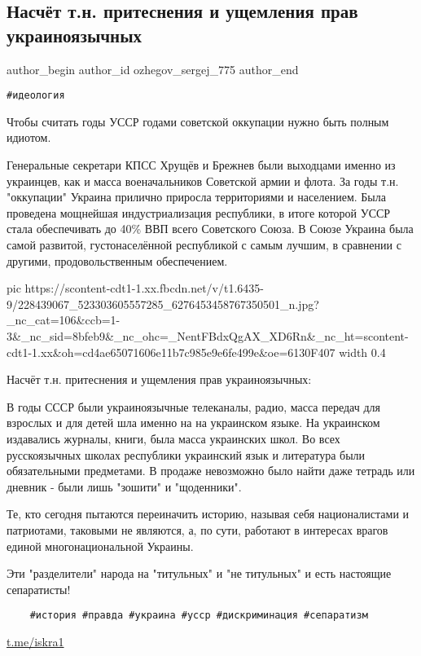  
 
 
 
 
 
\subsection{Насчёт т.н. притеснения и ущемления прав украиноязычных}
\label{sec:01_08_2021.fb.ozhegov_sergej_775.1.uschemlenie_mova_ussr}
 
\ifcmt
 author_begin
   author_id ozhegov_sergej_775
 author_end
\fi

\verb|#идеология|

Чтобы считать годы УССР годами советской оккупации нужно быть полным идиотом.

Генеральные секретари КПСС Хрущёв и Брежнев были выходцами именно из украинцев,
как и масса военачальников Советской армии и флота. За годы т.н. "оккупации"
Украина прилично приросла территориями и населением. Была проведена мощнейшая
индустриализация республики, в итоге которой УССР стала обеспечивать до 40\%
ВВП всего Советского Союза. В Союзе Украина была самой развитой,
густонаселённой республикой с самым лучшим, в сравнении с другими,
продовольственным обеспечением.

\ifcmt
  pic https://scontent-cdt1-1.xx.fbcdn.net/v/t1.6435-9/228439067_523303605557285_6276453458767350501_n.jpg?_nc_cat=106&ccb=1-3&_nc_sid=8bfeb9&_nc_ohc=_NentFBdxQgAX_XD6Rn&_nc_ht=scontent-cdt1-1.xx&oh=cd4ae65071606e11b7c985e9e6fe499e&oe=6130F407
  width 0.4
\fi

Насчёт т.н. притеснения и ущемления прав украиноязычных:

В годы СССР были украиноязычные телеканалы, радио, масса передач для взрослых и
для детей шла именно на на украинском языке. На украинском издавались журналы,
книги, была масса украинских школ. Во всех русскоязычных школах республики
украинский язык и литература были обязательными предметами. В продаже
невозможно было найти даже тетрадь или дневник - были лишь "зошити" и
"щоденники".

Те, кто сегодня пытаются переиначить историю, называя себя националистами и
патриотами, таковыми не являются, а, по сути, работают в интересах врагов
единой многонациональной Украины. 

Эти "разделители" народа на "титульных" и "не титульных" и есть настоящие
сепаратисты!

\begin{verbatim}
	#история #правда #украина #усср #дискриминация #сепаратизм
\end{verbatim}
\url{t.me/iskra1}
